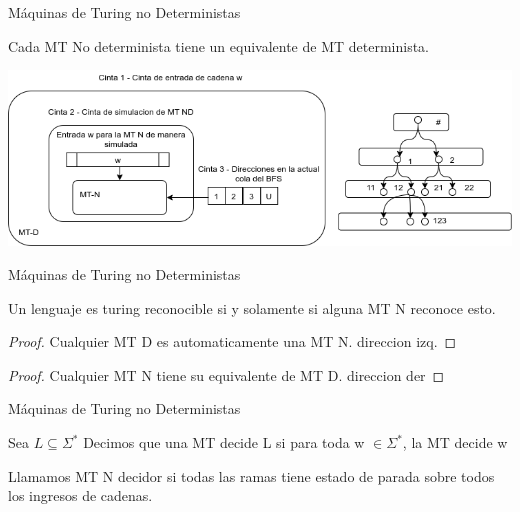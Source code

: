 \documentclass[11pt]{beamer}
\begin{document}
        \begin{frame}{Máquinas de Turing no Deterministas}
			\justifying
            \begin{theorem}
                Cada MT No determinista tiene un equivalente de MT determinista.
            \end{theorem}
            \begin{center}
            \includegraphics[scale=0.5]{img/teo1_mtn.png}
			\end{center}
		\end{frame}
		
		\begin{frame}{Máquinas de Turing no Deterministas}
			\justifying
            \begin{theorem}
                Un lenguaje es turing reconocible si y solamente si  alguna MT N reconoce esto.
            \end{theorem}
            \begin{proof}
                Cualquier MT D es automaticamente una MT N. direccion izq.
            \end{proof}
            \begin{proof}
                Cualquier MT N tiene su equivalente de MT D. direccion der
            \end{proof}
		\end{frame}
		
		\begin{frame}{Máquinas de Turing no Deterministas}
			\justifying
            \begin{definition}
                Sea $L\subseteq \Sigma^{*}$ Decimos que una MT decide L si para toda w $\in \Sigma^{*}$, la MT decide w
            \end{definition}
            \begin{definition}
                Llamamos MT N decidor si todas las ramas tiene estado de parada sobre todos los ingresos de cadenas.
            \end{definition}
		\end{frame}
		
\end{document}

